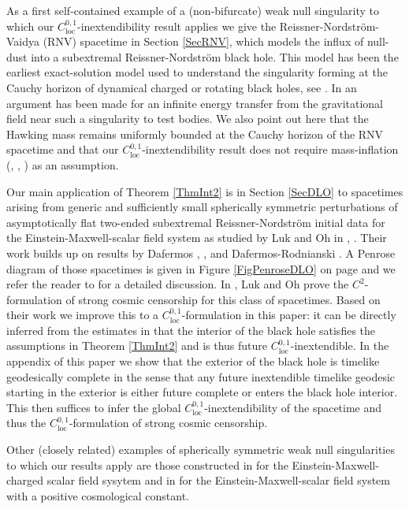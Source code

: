 \documentclass[reqno]{article}
\newcommand{\loc}{\mathrm{loc}}
\begin{document}
As a first self-contained example of a (non-bifurcate) weak null singularity to which our $C^{0,1}_{\loc}$-inextendibility result applies we give the Reissner-Nordstr\"om-Vaidya (RNV) spacetime in Section \ref{SecRNV}, which models the influx of null-dust into a subextremal Reissner-Nordstr\"om black hole. This model has been the earliest exact-solution model used to understand the singularity forming at the Cauchy horizon of dynamical charged or rotating black holes, see \cite{His81}. In \cite{HerHis92} an argument has been made for an infinite energy transfer from the gravitational field near such a singularity to test bodies. We also point out here that the Hawking mass remains uniformly bounded at the Cauchy horizon of the RNV spacetime and that our $C^{0,1}_{\loc}$-inextendibility result does not require mass-inflation (\cite{PoiIs89}, \cite{PoiIs90}, \cite{Ori91}) as an assumption.  

Our main application of Theorem \ref{ThmInt2}  is in Section \ref{SecDLO} to spacetimes arising from generic and sufficiently small spherically symmetric perturbations of asymptotically flat two-ended subextremal Reissner-Nordstr\"om initial data for the Einstein-Maxwell-scalar field system as studied by Luk and Oh in \cite{LukOh19I}, \cite{LukOh19II}. Their work builds up on results by Dafermos \cite{Daf03}, \cite{Daf05a}, \cite{Daf14} and Dafermos-Rodnianski \cite{DafRod05}. A Penrose diagram of those spacetimes is given in Figure \ref{FigPenroseDLO} on page \pageref{FigPenroseDLO} and we refer the reader to \cite{LukOh19I} for a detailed discussion.  In \cite{LukOh19I}, \cite{LukOh19II} Luk and Oh prove the $C^2$-formulation of strong cosmic censorship for this class of spacetimes. Based on their work we improve this to a $C^{0,1}_{\loc}$-formulation in this paper: it can be directly inferred from the estimates in \cite{LukOh19I} that the interior of the black hole satisfies the assumptions in Theorem \ref{ThmInt2} and is thus future $C^{0,1}_{\loc}$-inextendible. In the appendix of this paper we show that the exterior of the black hole is timelike geodesically complete in the sense that any future inextendible timelike geodesic starting in the exterior is either future complete or enters the black hole interior. This then suffices to infer the global $C^{0,1}_{\loc}$-inextendibility of the spacetime and thus the $C^{0,1}_{\loc}$-formulation of strong cosmic censorship.

Other (closely related) examples of spherically symmetric weak null singularities to which our results apply are those constructed in \cite{VdM18} for the Einstein-Maxwell-charged scalar field sysytem and in \cite{CoGiNaDru17} for the Einstein-Maxwell-scalar field system with a positive cosmological constant.
\newline
\end{document}

